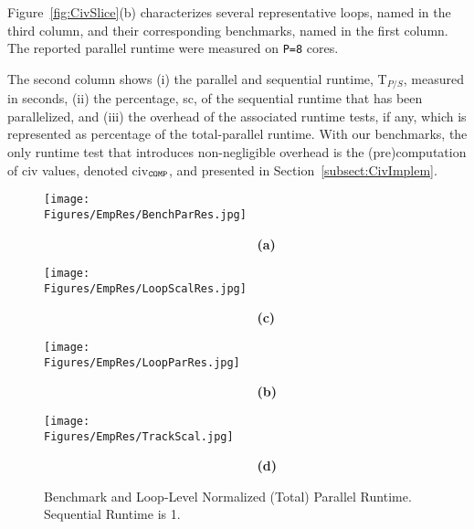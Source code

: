 \documentclass[10pt,nocopyrightspace]{sigplanconf}
\newcommand{\Figures}[1]{../Figures/}
\begin{document}
%
Figure~\ref{fig:CivSlice}(b) characterizes several representative loops, named in 
the third column, and their corresponding benchmarks, named in the first column.
The reported parallel runtime were measured on {\tt P=8} cores.


The second column shows 
(i)   the parallel and sequential runtime, T$_{P/S}$, measured in seconds,
(ii)  the percentage, {\sc sc}, of the sequential runtime that has been parallelized, and 
(iii) the overhead of the associated runtime tests, if any, which is represented as percentage of
        the total-parallel runtime. With our benchmarks, the only runtime test that introduces
        non-negligible overhead is the (pre)computation of {\sc civ} values, 
        denoted {\sc civ}$_{\tt{}COMP}$, and presented in Section~\ref{subsect:CivImplem}.   


\begin{figure*}[t] 
\begin{minipage}{1.2\columnwidth}
    \texttt{[image: \\Figures/EmpRes/BenchParRes.jpg]} 

      {\bf~~~~~~~~~~~~~~~~~~~~~~~~~~~~~(a)} \vspace{2ex}

    \texttt{[image: \\Figures/EmpRes/LoopScalRes.jpg]}
      
      {\bf~~~~~~~~~~~~~~~~~~~~~~~~~~~~~(c)}\vspace{1ex}

\end{minipage}
\begin{minipage}{0.9\columnwidth}
    \texttt{[image: \\Figures/EmpRes/LoopParRes.jpg]} 

      {\bf~~~~~~~~~~~~~~~~~~~~~~~~~~~~~(b)}\vspace{2ex}

   \texttt{[image: \\Figures/EmpRes/TrackScal.jpg]}
      
      {\bf~~~~~~~~~~~~~~~~~~~~~~~~~~~~~(d)}\vspace{1ex}

\end{minipage}
\caption{ Benchmark and Loop-Level Normalized (Total) Parallel Runtime. Sequential Runtime is 1.}
\label{fig:ParRuntime} %
\end{figure*}
\end{document}
